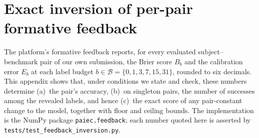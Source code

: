 \section{Exact inversion of per-pair formative feedback}\label{app:inversion}

The platform's formative feedback reports, for every evaluated subject--benchmark pair of our own submission, the
Brier score $B_b$ and the calibration error $E_b$ at each label budget $b\in\mathcal{B}=\{0,1,3,7,15,31\}$, rounded to
six decimals. This appendix shows that, under conditions we state and check, these numbers determine (a)~the pair's
accuracy, (b)~on singleton pairs, the number of successes among the revealed labels, and hence (c)~the exact score of
any pair-constant change to the model, together with floor and ceiling bounds. The implementation is the NumPy package
\texttt{paiec.feedback}; each number quoted here is asserted by \texttt{tests/test\_feedback\_inversion.py}.

